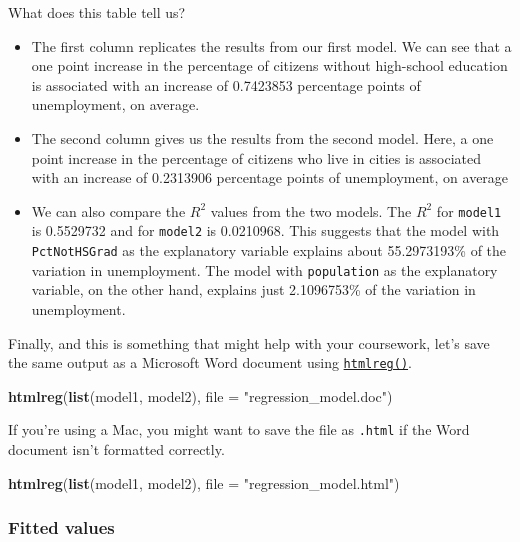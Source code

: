 \documentclass[]{article}
\newenvironment{Shaded}{\begin{snugshade}}{\end{snugshade}}
\newcommand{\DataTypeTok}[1]{\textcolor[rgb]{0.13,0.29,0.53}{#1}}
\newcommand{\KeywordTok}[1]{\textcolor[rgb]{0.13,0.29,0.53}{\textbf{#1}}}
\newcommand{\NormalTok}[1]{#1}
\newcommand{\StringTok}[1]{\textcolor[rgb]{0.31,0.60,0.02}{#1}}
\providecommand{\tightlist}{%
  \setlength{\itemsep}{0pt}\setlength{\parskip}{0pt}}
\begin{document}
What does this table tell us?

\begin{itemize}
\tightlist
\item
  The first column replicates the results from our first model. We can see that a one point increase in the percentage of citizens without high-school education is associated with an increase of 0.7423853 percentage points of unemployment, on average.
\item
  The second column gives us the results from the second model. Here, a one point increase in the percentage of citizens who live in cities is associated with an increase of 0.2313906 percentage points of unemployment, on average
\item
  We can also compare the \(R^2\) values from the two models. The \(R^2\) for \texttt{model1} is 0.5529732 and for \texttt{model2} is 0.0210968. This suggests that the model with \texttt{PctNotHSGrad} as the explanatory variable explains about 55.2973193\% of the variation in unemployment. The model with \texttt{population} as the explanatory variable, on the other hand, explains just 2.1096753\% of the variation in unemployment.
\end{itemize}

Finally, and this is something that might help with your coursework, let's save the same output as a Microsoft Word document using \href{http://bit.ly/R_texreg}{\texttt{htmlreg()}}.

\begin{Shaded}
\begin{Highlighting}[]
\KeywordTok{htmlreg}\NormalTok{(}\KeywordTok{list}\NormalTok{(model1, model2), }\DataTypeTok{file =} \StringTok{"regression_model.doc"}\NormalTok{)}
\end{Highlighting}
\end{Shaded}

If you're using a Mac, you might want to save the file as \texttt{.html} if the Word document isn't formatted correctly.

\begin{Shaded}
\begin{Highlighting}[]
\KeywordTok{htmlreg}\NormalTok{(}\KeywordTok{list}\NormalTok{(model1, model2), }\DataTypeTok{file =} \StringTok{"regression_model.html"}\NormalTok{)}
\end{Highlighting}
\end{Shaded}

\hypertarget{fitted-values}{%
\subsubsection{Fitted values}\label{fitted-values}}
\end{document}
